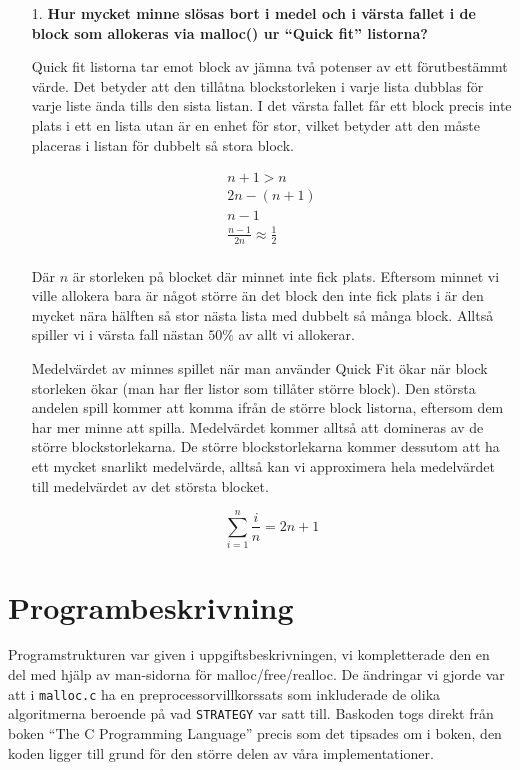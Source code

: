 \documentclass[a4paper,10pt,titlepage]{article}
\begin{document}
\begin{enumerate}
\item[1.] \textbf{\footnotesize Hur mycket minne slösas bort i medel och i värsta fallet i de block som allokeras via malloc() ur ``Quick fit'' listorna?}

Quick fit listorna tar emot block av jämna två potenser av ett
förutbestämmt värde. Det betyder att den tillåtna blockstorleken i
varje lista dubblas för varje liste ända tills den sista listan. I
det värsta fallet får ett block precis inte plats i ett en lista utan är en
enhet för stor, vilket betyder att den måste placeras i listan för dubbelt så
stora block.

\begin{equation*}
\begin{array}{c}
n+1 > n\\
2n - (n+1)\\
n-1\\
\frac{n-1}{2n} \approx \frac{1}{2}\\
\end{array}
\end{equation*}

Där $n$ är storleken på blocket där minnet inte fick plats.
Eftersom minnet vi ville allokera bara är något större än det block den inte
fick plats i är den mycket nära hälften så stor nästa lista med dubbelt så många
block. Alltså spiller vi i värsta fall nästan $50\%$ av allt vi allokerar.

Medelvärdet av minnes spillet när man använder Quick Fit ökar när block
storleken ökar (man har fler listor som tillåter större block). Den största
andelen spill kommer att komma ifrån de större block listorna, eftersom dem har
mer minne att spilla. Medelvärdet kommer alltså att domineras av de större
blockstorlekarna. De större blockstorlekarna kommer dessutom att ha ett mycket
snarlikt medelvärde, alltså kan vi approximera hela medelvärdet till medelvärdet
av det största blocket.

\begin{equation*}
\sum^n_{i=1}\frac{i}{n} = 2n + 1
\end{equation*}

\end{enumerate}

\newpage
\section{Programbeskrivning}

Programstrukturen var given i uppgiftsbeskrivningen, vi kompletterade den en del med hjälp av man-sidorna för malloc/free/realloc.
De ändringar vi gjorde var att i \texttt{malloc.c} ha en preprocessorvillkorssats som inkluderade de olika algoritmerna beroende på vad \texttt{STRATEGY} var satt till. Baskoden togs direkt från boken ``The C Programming Language'' precis som det tipsades om i boken, den koden ligger till grund för den större delen av våra implementationer.
\end{document}
